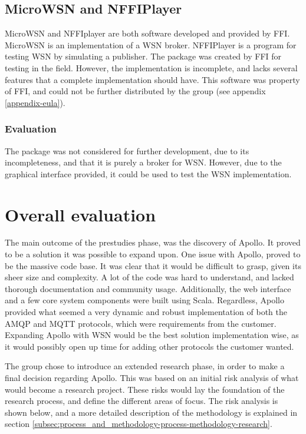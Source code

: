 \subsection{MicroWSN and NFFIPlayer}
\label{subsec:prestudies-existing_solutions-micro_wsn_and_nffiplayer}

MicroWSN and NFFIplayer are both software developed and provided by FFI. MicroWSN is an implementation of a WSN broker. NFFIPlayer is a program for testing WSN by simulating a publisher. The package was created by FFI for testing in the field. However, the implementation is incomplete, and lacks several features that a complete implementation should have. This software was property of FFI, and could not be further distributed by the group (see appendix \ref{appendix-eula}).

\subsubsection{Evaluation}
\label{subsec:prestudies-existing_solutions-micro_wsn_and_nffiplayer-evaluation}

The package was not considered for further development, due to its incompleteness, and that it is purely a broker for WSN. However, due to the graphical interface provided, it could be used to test the WSN implementation.

\section{Overall evaluation}
\label{sec:prestudies-overall_evaluation}

The main outcome of the prestudies phase, was the discovery of Apollo. It proved to be a solution it was possible to expand upon. One issue with Apollo, proved to be the massive code base. It was clear that it would be difficult to grasp, given its sheer size and complexity. A lot of the code was hard to understand, and lacked thorough documentation and community usage. Additionally, the web interface and a few core system components were built using Scala. Regardless, Apollo provided what seemed a very dynamic and robust implementation of both the AMQP and MQTT protocols, which were requirements from the customer. Expanding Apollo with WSN would be the best solution implementation wise, as it would possibly open up time for adding other protocols the customer wanted.

The group chose to introduce an extended research phase, in order to make a final decision regarding Apollo. This was based on an initial risk analysis of what would become a research project. These risks would lay the foundation of the research process, and define the different areas of focus. The risk analysis is shown below, and a more detailed description of the methodology is explained in section \ref{subsec:process_and_methodology-process-methodology-research}.


